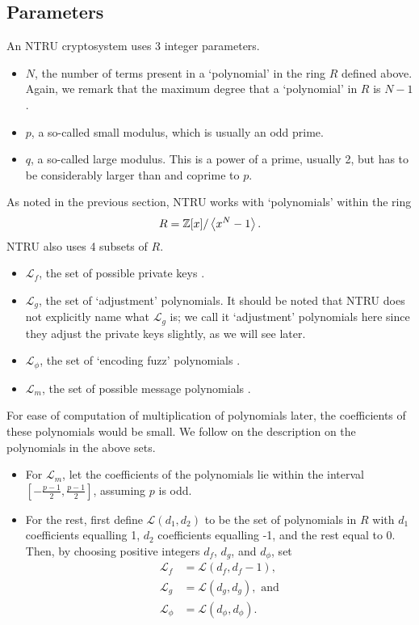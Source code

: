 \subsection{Parameters}
An NTRU cryptosystem uses 3 integer parameters.
\begin{itemize}
    \item $N$, the number of terms present in a `polynomial' in the ring $R$ defined above. Again, we remark that the maximum degree that a `polynomial' in $R$ is $N - 1$.
    \item $p$, a so-called small modulus, which is usually an odd prime.
    \item $q$, a so-called large modulus. This is a power of a prime, usually 2, but has to be considerably larger than and coprime to $p$.
\end{itemize}

As noted in the previous section, NTRU works with `polynomials' within the ring
\[
    R = \mathbb{Z}[x] / \left\langle x^N - 1\right\rangle.
\]
NTRU also uses 4 subsets of $R$.
\begin{itemize}
    \item $\mathcal{L}_f$, the set of possible private keys \cite[\S 1.2]{hoffstein_pipher_silverman_1998}.
    \item $\mathcal{L}_g$, the set of `adjustment' polynomials. It should be noted that NTRU does not explicitly name what $\mathcal{L}_g$ is; we call it `adjustment' polynomials here since they adjust the private keys slightly, as we will see later.
    \item $\mathcal{L}_\phi$, the set of `encoding fuzz' polynomials \cite[\S 1.3]{hoffstein_pipher_silverman_1996}.
    \item $\mathcal{L}_m$, the set of possible message polynomials \cite[\S 1.3]{hoffstein_pipher_silverman_1998}.
\end{itemize}

For ease of computation of multiplication of polynomials later, the coefficients of these polynomials would be small. We follow \cite[\S~2.2]{hoffstein_pipher_silverman_1998} on the description on the polynomials in the above sets.
\begin{itemize}
    \item For $\mathcal{L}_m$, let the coefficients of the polynomials lie within the interval $\left[-\frac{p-1}2, \frac{p-1}2\right]$, assuming $p$ is odd.
    \item For the rest, first define $\mathcal{L}(d_1, d_2)$ to be the set of polynomials in $R$ with $d_1$ coefficients equalling 1, $d_2$ coefficients equalling -1, and the rest equal to 0. Then, by choosing positive integers $d_f$, $d_g$, and $d_\phi$, set
    \begin{align*}
        \mathcal{L}_f &= \mathcal{L}(d_f, d_f-1),\\
        \mathcal{L}_g &= \mathcal{L}(d_g, d_g), \text{ and}\\
        \mathcal{L}_\phi &= \mathcal{L}(d_\phi, d_\phi).
    \end{align*}
\end{itemize}

